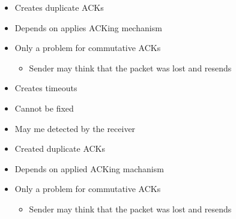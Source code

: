 \begin{itemize}
\begin{itemize}
                \begin{itemize}
                    \item Creates duplicate ACKs
                    \item Depends on applies ACKing mechanism
                    \item Only a problem for commutative ACKs
                        \begin{itemize}
                            \item Sender may think that the packet was lost and resends
                        \end{itemize}
                \end{itemize}
                \begin{itemize}
                    \item Creates timeouts
                    \item Cannot be fixed
                \end{itemize}
                \begin{itemize}
                    \item May me detected by the receiver
                    \item Created duplicate ACKs
                    \item Depends on applied ACKing machanism
                    \item Only a problem for commutative ACKs
                        \begin{itemize}
                            \item Sender may think that the packet was lost and resends
                        \end{itemize}
                \end{itemize}
        \end{itemize}
\end{itemize}

